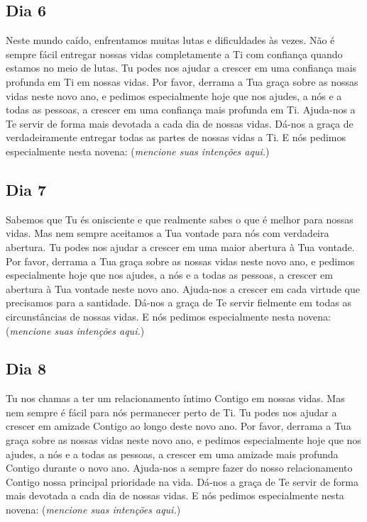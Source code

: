 \documentclass[a4paper,14pt]{extarticle} \usepackage[utf8]{inputenc}
\begin{document}
\subsection{Dia 6}

Neste mundo caído, enfrentamos muitas lutas e dificuldades às vezes. Não é sempre fácil entregar nossas vidas completamente a Ti com confiança quando estamos no meio de lutas. Tu podes nos ajudar a crescer em uma confiança mais profunda em Ti em nossas vidas.
Por favor, derrama a Tua graça sobre as nossas vidas neste novo ano, e pedimos especialmente hoje que nos ajudes, a nós e a todas as pessoas, a crescer em uma confiança mais profunda em Ti.
Ajuda-nos a Te servir de forma mais devotada a cada dia de nossas vidas. Dá-nos a graça de verdadeiramente entregar todas as partes de nossas vidas a Ti.
E nós pedimos especialmente nesta novena: (\textit{mencione suas intenções aqui.})

\subsection{Dia 7}

Sabemos que Tu és onisciente e que realmente sabes o que é melhor para nossas vidas. Mas nem sempre aceitamos a Tua vontade para nós com verdadeira abertura. Tu podes nos ajudar a crescer em uma maior abertura à Tua vontade.
Por favor, derrama a Tua graça sobre as nossas vidas neste novo ano, e pedimos especialmente hoje que nos ajudes, a nós e a todas as pessoas, a crescer em abertura à Tua vontade neste novo ano.
Ajuda-nos a crescer em cada virtude que precisamos para a santidade. Dá-nos a graça de Te servir fielmente em todas as circunstâncias de nossas vidas.
E nós pedimos especialmente nesta novena: (\textit{mencione suas intenções aqui.})

\subsection{Dia 8}

Tu nos chamas a ter um relacionamento íntimo Contigo em nossas vidas. Mas nem sempre é fácil para nós permanecer perto de Ti. Tu podes nos ajudar a crescer em amizade Contigo ao longo deste novo ano.
Por favor, derrama a Tua graça sobre as nossas vidas neste novo ano, e pedimos especialmente hoje que nos ajudes, a nós e a todas as pessoas, a crescer em uma amizade mais profunda Contigo durante o novo ano.
Ajuda-nos a sempre fazer do nosso relacionamento Contigo nossa principal prioridade na vida. Dá-nos a graça de Te servir de forma mais devotada a cada dia de nossas vidas.
E nós pedimos especialmente nesta novena: (\textit{mencione suas intenções aqui.})
\end{document}
